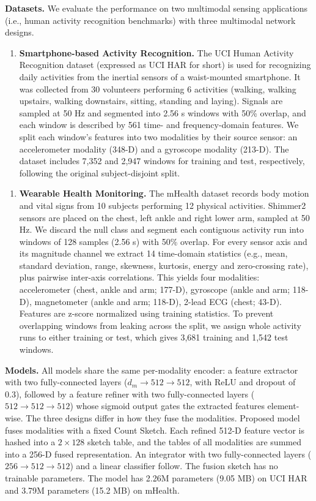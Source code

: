 \documentclass[sigconf]{acmart}
\begin{document}
{\bfseries Datasets.}
We evaluate the performance on two multimodal sensing applications (i.e., human activity recognition benchmarks) with three multimodal network designs.
\begin{enumerate}
    \item 
    {\bfseries Smartphone-based Activity Recognition.}
    The UCI Human Activity Recognition dataset (expressed as UCI HAR for short) is used for recognizing daily activities from the inertial sensors of a waist-mounted smartphone. It was collected from 30 volunteers performing 6 activities (walking, walking upstairs, walking downstairs, sitting, standing and laying). Signals are sampled at 50 Hz and segmented into 2.56 s windows with 50\% overlap, and each window is described by 561 time- and frequency-domain features. We split each window's features into two modalities by their source sensor: an accelerometer modality (348-D) and a gyroscope modality (213-D). The dataset includes 7,352 and 2,947 windows for training and test, respectively, following the original subject-disjoint split. 
\end{enumerate}

\begin{enumerate}
    \item 
    {\bfseries Wearable Health Monitoring.}
    The mHealth dataset records body motion and vital signs from 10 subjects performing 12 physical activities. Shimmer2 sensors are placed on the chest, left ankle and right lower arm, sampled at 50 Hz. We discard the null class and segment each contiguous activity run into windows of 128 samples (2.56 s) with 50\% overlap. For every sensor axis and its magnitude channel we extract 14 time-domain statistics (e.g., mean, standard deviation, range, skewness, kurtosis, energy and zero-crossing rate), plus pairwise inter-axis correlations. This yields four modalities: accelerometer (chest, ankle and arm; 177-D), gyroscope (ankle and arm; 118-D), magnetometer (ankle and arm; 118-D), 2-lead ECG (chest; 43-D). Features are z-score normalized using training statistics. To prevent overlapping windows from leaking across the split, we assign whole activity runs to either training or test, which gives 3,681 training and 1,542 test windows.
\end{enumerate}

{\bfseries Models.}
 All models share the same per-modality encoder: a feature extractor with two fully-connected layers ($d_m \rightarrow 512 \rightarrow 512$, with ReLU and dropout of 0.3), followed by a feature refiner with two fully-connected layers ($512 \rightarrow 512 \rightarrow 512$) whose sigmoid output gates the extracted features element-wise. The three designs differ in how they fuse the modalities. Proposed model fuses modalities with a fixed Count Sketch. Each refined 512-D feature vector is hashed into a $2 \times 128$ sketch table, and the tables of all modalities are summed into a 256-D fused representation. An integrator with two fully-connected layers ($256 \rightarrow 512 \rightarrow 512$) and a linear classifier follow. The fusion sketch has no trainable parameters. The model has 2.26M parameters (9.05 MB) on UCI HAR and 3.79M parameters (15.2 MB) on mHealth.
\end{document}
